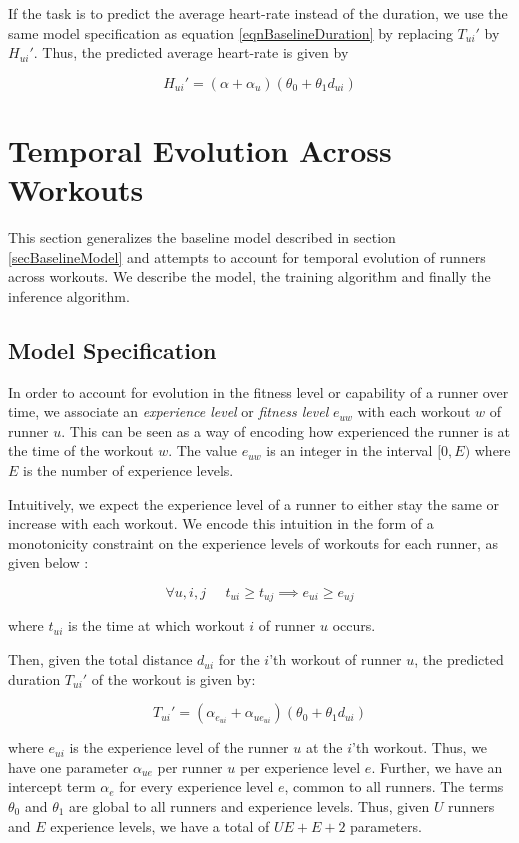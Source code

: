 \documentclass{acm_proc_article-sp}
\begin{document}
If the task is to predict the average heart-rate instead of the duration, we use the same model specification as equation \ref{eqnBaselineDuration} by replacing $T_{ui}'$ by $H_{ui}'$. Thus, the predicted average heart-rate is given by

$$H_{ui}' = (\alpha + \alpha_{u})(\theta_0 + \theta_1 d_{ui})$$


\section{Temporal Evolution Across \\ Workouts}
\label{secTemporalModelUsers}
This section generalizes the baseline model described in section \ref{secBaselineModel} and attempts to account for temporal evolution of runners across workouts. We describe the model, the training algorithm and finally the inference algorithm.

\subsection{Model Specification}
In order to account for evolution in the fitness level or capability of a runner over time,  we associate an \emph{experience level} or \emph{fitness level} $e_{uw}$ with each workout $w$ of runner $u$. This can be seen as a way of encoding how experienced the runner is at the time of the workout $w$. The value $e_{uw}$ is an integer in the interval $[0, E)$ where $E$ is the number of experience levels. 

Intuitively, we expect the experience level of a runner to either stay the same or increase with each workout. We encode this intuition in the form of a monotonicity constraint on the experience levels of workouts for each runner, as given below \cite{www13}:

$$\forall u,i,j \;\;\;\;\; t_{ui} \geq t_{uj} \implies e_{ui} \geq e_{uj}$$

where $t_{ui}$ is the time at which workout $i$ of runner $u$ occurs.

Then, given the total distance $d_{ui}$ for the $i$'th workout of runner $u$, the predicted duration $T_{ui}'$ of the workout is given by:

\begin{equation}
\label{eqnModelDuration}
T_{ui}' = (\alpha_{e_{ui}} + \alpha_{ue_{ui}})(\theta_0 + \theta_1 d_{ui})
\end{equation}


where $e_{ui}$ is the experience level of the runner $u$ at the $i$'th workout. Thus, we have one parameter $\alpha_{ue}$ per runner $u$ per experience level $e$. Further, we have an intercept term $\alpha_e$ for every experience level $e$, common to all runners. The terms $\theta_0$ and $\theta_1$ are global to all runners and experience levels. Thus, given $U$ runners and $E$ experience levels, we have a total of $UE + E + 2$ parameters.
\end{document}
